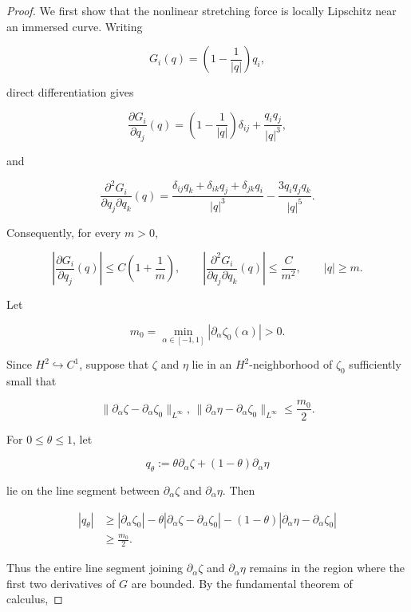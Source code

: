 \documentclass{article}[12pt]
\theoremstyle{Theorem}
\begin{document}
\begin{proof}
We first show that the nonlinear stretching force is locally Lipschitz near an immersed curve. Writing

$$
    G_i(q)=\left(1-\frac{1}{|q|}\right)q_i,
$$

direct differentiation gives

$$
    \frac{\partial G_i}{\partial q_j}(q)
    =
    \left(1-\frac{1}{|q|}\right)\delta_{ij}
    +\frac{q_iq_j}{|q|^3},
$$

and

$$
    \frac{\partial^2G_i}{\partial q_j\partial q_k}(q)
    =
    \frac{
        \delta_{ij}q_k+\delta_{ik}q_j+\delta_{jk}q_i
    }{|q|^3}
    -
    \frac{3q_iq_jq_k}{|q|^5}.
$$

Consequently, for every \(m>0\),

$$
    \left|
        \frac{\partial G_i}{\partial q_j}(q)
    \right|
    \leq C\left(1+\frac1m\right),
    \qquad
    \left|
        \frac{\partial^2G_i}{\partial q_j\partial q_k}(q)
    \right|
    \leq \frac{C}{m^2},
    \qquad |q|\geq m.
$$

Let

$$
    m_0=\min_{\alpha\in[-1,1]}
    |\partial_\alpha\zeta_0(\alpha)|>0.
$$

Since $H^2 \hookrightarrow C^1$, suppose that \(\zeta\) and \(\eta\) lie in an \(H^2\)-neighborhood of \(\zeta_0\) sufficiently small that

$$
    \|\partial_\alpha\zeta-\partial_\alpha\zeta_0\|_{L^\infty},
    \,
    \|\partial_\alpha\eta-\partial_\alpha\zeta_0\|_{L^\infty}
    \leq \frac{m_0}{2}.
$$

For \(0\leq\theta\leq1\), let

$$
    q_\theta
    :=
    \theta\partial_\alpha\zeta
    +(1-\theta)\partial_\alpha\eta
$$

lie on the line segment between $\partial_\alpha \zeta$ and $\partial_\alpha \eta$. Then

$$
\begin{aligned}
    |q_\theta|
    &\geq
    |\partial_\alpha\zeta_0|
    -
    \theta
    |\partial_\alpha\zeta-\partial_\alpha\zeta_0|
    -
    (1-\theta)
    |\partial_\alpha\eta-\partial_\alpha\zeta_0|\\
    &\geq \frac{m_0}{2}.
\end{aligned}
$$

Thus the entire line segment joining
\(\partial_\alpha\zeta\) and \(\partial_\alpha\eta\) remains in the region where the first two derivatives of \(G\) are bounded. By the fundamental theorem of calculus,


\end{proof}
\end{document}
